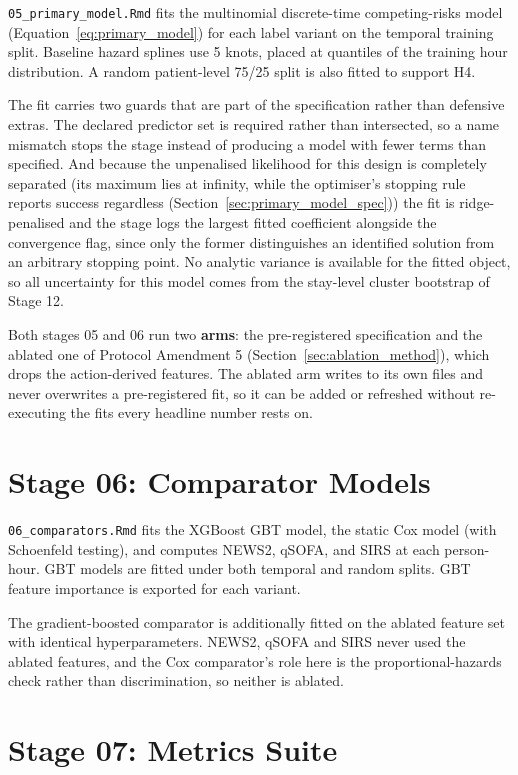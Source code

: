 \texttt{05\_primary\_model.Rmd} fits the multinomial discrete-time
competing-risks model (Equation~\ref{eq:primary_model}) for each label variant
on the temporal training split. Baseline hazard splines use 5 knots, placed at
quantiles of the training hour distribution. A random patient-level 75/25 split
is also fitted to support H4.

The fit carries two guards that are part of the specification rather than
defensive extras. The declared predictor set is required rather than
intersected, so a name mismatch stops the stage instead of producing a model
with fewer terms than specified. And because the unpenalised likelihood for this
design is completely separated (its maximum lies at infinity, while the
optimiser's stopping rule reports success regardless
(Section~\ref{sec:primary_model_spec})) the fit is ridge-penalised and the
stage logs the largest fitted coefficient alongside the convergence flag, since
only the former distinguishes an identified solution from an arbitrary stopping
point. No analytic variance is available for the fitted object, so all
uncertainty for this model comes from the stay-level cluster bootstrap of
Stage 12.

Both stages 05 and 06 run two \textbf{arms}: the pre-registered specification
and the ablated one of Protocol Amendment 5
(Section~\ref{sec:ablation_method}), which drops the action-derived features.
The ablated arm writes to its own files and never overwrites a pre-registered
fit, so it can be added or refreshed without re-executing the fits every
headline number rests on.


\section{Stage 06: Comparator Models}

\texttt{06\_comparators.Rmd} fits the XGBoost GBT model, the static Cox model
(with Schoenfeld testing), and computes NEWS2, qSOFA, and SIRS at each
person-hour. GBT models are fitted under both temporal and random splits. GBT
feature importance is exported for each variant.

The gradient-boosted comparator is additionally fitted on the ablated feature
set with identical hyperparameters. NEWS2, qSOFA and SIRS never used the
ablated features, and the Cox comparator's role here is the
proportional-hazards check rather than discrimination, so neither is ablated.


\section{Stage 07: Metrics Suite}

